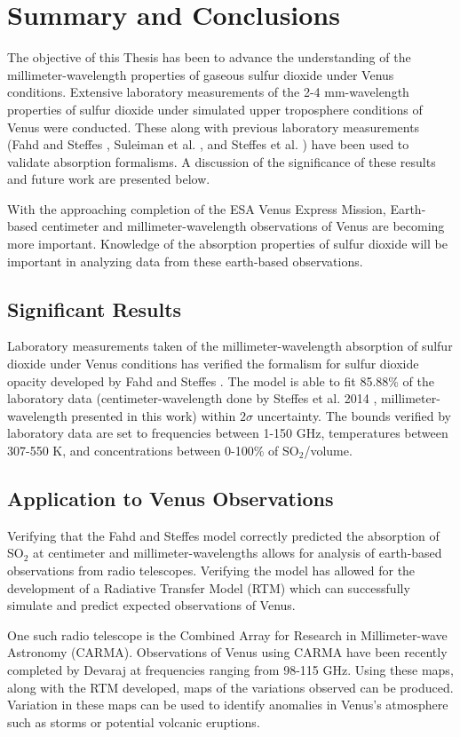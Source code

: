 \chapter{Summary and Conclusions}
The objective of this Thesis has been to advance the understanding of the millimeter-wavelength properties of gaseous sulfur dioxide under Venus conditions. Extensive laboratory measurements of the 2-4 mm-wavelength properties of sulfur dioxide under simulated upper troposphere conditions of Venus were conducted. These along with previous laboratory measurements (Fahd and Steffes \cite{Fahd-1991}, Suleiman et al. \cite{Suleiman-1996}, and Steffes et al. \cite{Steffes-2014}) have been used to validate absorption formalisms. A discussion of the significance of these results and future work are presented below. 

With the approaching completion of the ESA Venus Express Mission, Earth-based centimeter and millimeter-wavelength observations of Venus are becoming more important. Knowledge of the absorption properties of sulfur dioxide will be important in analyzing data from these earth-based observations. 
\section{Significant Results}

Laboratory measurements taken of the millimeter-wavelength absorption of sulfur dioxide under Venus conditions has verified the formalism for sulfur dioxide opacity developed by Fahd and Steffes \cite{Fahd-1991}. The model is able to fit 85.88\% of the laboratory data (centimeter-wavelength done by Steffes et al. 2014 \cite{Steffes-2014}, millimeter-wavelength presented in this work) within $2\sigma$ uncertainty. The bounds verified by laboratory data are set to frequencies between 1-150 GHz, temperatures between 307-550 K, and concentrations between 0-100\% of SO$_2$/volume. 
\section{Application to Venus Observations}
Verifying that the Fahd and Steffes \cite{Fahd-1991} model correctly predicted the absorption of SO$_2$ at centimeter and millimeter-wavelengths allows for analysis of earth-based observations from radio telescopes. Verifying the model has allowed for the development of a Radiative Transfer Model (RTM) which can successfully simulate and predict expected observations of Venus. 

One such radio telescope is the Combined Array for Research in Millimeter-wave Astronomy (CARMA). Observations of Venus using CARMA have been recently completed by Devaraj \cite{Devaraj-CARMA} at frequencies ranging from 98-115 GHz. Using these maps, along with the RTM developed, maps of the variations observed can be produced. Variation in these maps can be used to identify anomalies in Venus's atmosphere such as storms or potential volcanic eruptions.

